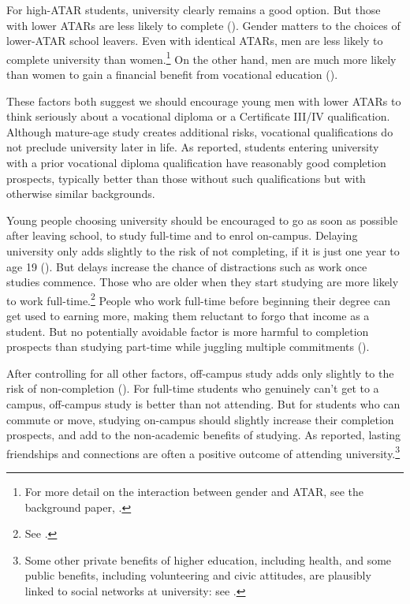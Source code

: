 For high-ATAR students, university clearly remains a good option. But those with lower ATARs are less likely to complete (). Gender matters to the choices of lower-ATAR school leavers. Even with identical ATARs, men are less likely to complete university than women.\footnote{For more detail on the interaction between gender and ATAR, see the background paper, \textcite[][sections~3.1 and 5.1]{Cherastidtham2018a}.} On the other hand, men are much more likely than women to gain a financial benefit from vocational education ().

These factors both suggest we should encourage young men with lower ATARs to think seriously about a vocational diploma or a Certificate III/IV qualification. Although mature-age study creates additional risks, vocational qualifications do not preclude university later in life. As  reported, students entering university with a prior vocational diploma qualification have reasonably good completion prospects, typically better than those without such qualifications but with otherwise similar backgrounds.

Young people choosing university should be encouraged to go as soon as possible after leaving school, to study full-time and to enrol on-campus. Delaying university only adds slightly to the risk of not completing, if it is just one year to age 19 (). But delays increase the chance of distractions such as work once studies commence. Those who are older when they start studying are more likely to work full-time.\footnote{See \textcite[][section~5.4]{Cherastidtham2018a}.} 
People who work full-time before beginning their degree can get used to earning more, making them reluctant to forgo that income as a student. But no potentially avoidable factor is more harmful to completion prospects than studying part-time while juggling multiple commitments ().

After controlling for all other factors, off-campus study adds only slightly to the risk of non-completion (). For full-time students who genuinely can't get to a campus, off-campus study is better than not attending. But for students who can commute or move, studying on-campus should slightly increase their completion prospects, and add to the non-academic benefits of studying. As  reported, lasting friendships and connections are often a positive outcome of attending university.\footnote{Some other private benefits of higher education, including health, and some public benefits, including volunteering and civic attitudes, are plausibly linked to social networks at university: see \textcite{Savage2012}.}

